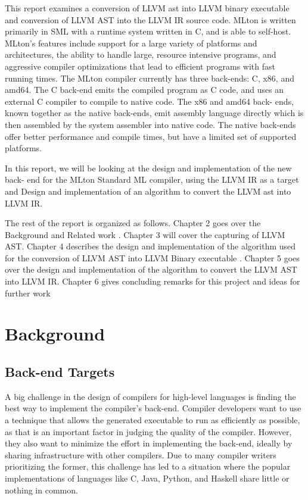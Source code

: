 \documentclass[openany]{book}
\begin{document}
 This  report  examines  a conversion of LLVM ast into LLVM binary executable and conversion of LLVM AST into the LLVM IR source code. MLton
is written primarily in SML with a runtime system written in C, and is able to self-host.
MLton's  features  include  support  for  a  large  variety  of  platforms  and  architectures,  the
ability to handle large, resource intensive programs, and aggressive compiler optimizations
that lead to efficient programs with fast running times. The MLton compiler currently has
three back-ends:  C, x86, and amd64.  The C back-end emits the compiled program as C
code, and uses an external C compiler to compile to native code. The x86 and amd64 back-
ends, known together as the native back-ends, emit assembly language directly which is
then assembled by the system assembler into native code. The native back-ends offer better
performance and compile times, but have a limited set of supported platforms.

In this report, we will be looking at the design and implementation of the new back-
end for the MLton Standard ML compiler, using the LLVM IR as a target and Design and implementation of an algorithm to convert the LLVM ast into LLVM IR.

The rest of the report is organized as follows. Chapter 2 goes over the Background and Related work . Chapter 3 will cover the capturing of LLVM AST. Chapter 4 describes the design
and implementation of the algorithm used for the conversion of LLVM AST into LLVM Binary executable . Chapter 5 goes over the design and implementation of the algorithm to convert the LLVM AST into LLVM IR. Chapter 6 gives concluding remarks for this project and ideas for further work

\chapter{Background}
\Large
	\section{Back-end Targets}
	A  big  challenge  in  the  design  of  compilers  for  high-level  languages  is  finding  the  best
	way to implement the compiler's back-end.  Compiler developers want to use a technique
	that allows the generated executable to run as efficiently as possible, as that is an important
	factor in judging the quality of the compiler. However, they also want to minimize the effort
	in implementing the back-end, ideally by sharing infrastructure with other compilers. Due
	to many compiler writers prioritizing the former, this challenge has led to a situation where
	the popular implementations of languages like C, Java, Python, and Haskell share little or
	nothing in common.
	
\end{document}
